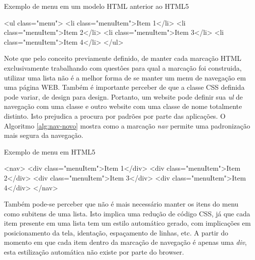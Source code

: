 \documentclass[
	12pt,				%
	oneside,			%
	a4paper,			%
	english,			%
	brazil				%
	]{abntex2ppgsi}
\begin{document}
\begin{algorithm}[htbp]
	\caption{Exemplo de menu em um modelo HTML anterior ao HTML5}
	\label{alg:nav-antigo}
	\begin{algorithmic}
		\State \textless ul class="menu"\textgreater
			\State \textless li class="menuItem"\textgreater Item 1\textless/li\textgreater
			\State \textless li class="menuItem"\textgreater Item 2\textless/li\textgreater
			\State \textless li class="menuItem"\textgreater Item 3\textless/li\textgreater
			\State \textless li class="menuItem"\textgreater Item 4\textless/li\textgreater
		\State	\textless/ul\textgreater
	\end{algorithmic}
\end{algorithm}

Note que pelo conceito previamente definido, de manter cada marcação HTML exclusivamente trabalhando com questôes para qual a marcação foi construida, utilizar uma lista não é a melhor forma de se manter um menu de navegação em uma página WEB. Também é importante perceber de que a classe CSS definida pode variar, de design para design. Portanto, um website pode definir sua \textit{ul} de navegação com uma classe e outro website com uma classe de nome totalmente distinto. Isto prejudica a procura por padrões por parte das aplicações. O Algoritmo \ref{alg:nav-novo} mostra como a marcação \textit{nav} permite uma padronização mais segura da navegação.

\begin{algorithm}[htbp]
	\caption{Exemplo de menu em HTML5}
	\label{alg:nav-novo}
	\begin{algorithmic}
		\State \textless nav\textgreater
			\State \textless div class="menuItem"\textgreater Item 1\textless/div\textgreater
			\State \textless div class="menuItem"\textgreater Item 2\textless/div\textgreater
			\State \textless div class="menuItem"\textgreater Item 3\textless/div\textgreater
			\State \textless div class="menuItem"\textgreater Item 4\textless/div\textgreater
		\State	\textless/nav\textgreater
	\end{algorithmic}
\end{algorithm}

Também pode-se perceber que não é mais necessário manter os itens do menu como subitens de uma lista. Isto implica uma redução de código CSS, já que cada item presente em uma lista tem um estilo automático gerado, com implicações em posicionamento da tela, identação, espaçamento de linhas, etc. A partir do momento em que cada item dentro da marcação de navegação é apenas uma \textit{div}, esta estilização automática não existe por parte do browser. 
\end{document}
